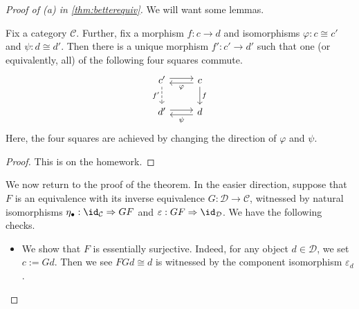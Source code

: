 \begin{proof}[Proof of (a) in \autoref{thm:betterequiv}]
	We will want some lemmas.
	\begin{lemma} \label{lem:optimize}
		Fix a category $\mathcal C$. Further, fix a morphism $f:c\to d$ and isomorphisms $\varphi:c\cong c'$ and $\psi:d\cong d'$. Then there is a unique morphism $f':c'\to d'$ such that one (or equivalently, all) of the following four squares commute.
		\[\begin{tikzcd}
			{c'} & c \\
			{d'} & d
			\arrow["{f'}"', dashed, from=1-1, to=2-1]
			\arrow[shift left=1, from=1-1, to=1-2]
			\arrow["\varphi", shift left=1, from=1-2, to=1-1]
			\arrow[shift left=1, from=2-1, to=2-2]
			\arrow["\psi", shift left=1, from=2-2, to=2-1]
			\arrow["f", from=1-2, to=2-2]
		\end{tikzcd}\]
		Here, the four squares are achieved by changing the direction of $\varphi$ and $\psi$.
	\end{lemma}
	\begin{proof}
		This is on the homework.
	\end{proof}
	We now return to the proof of the theorem. In the easier direction, suppose that $F$ is an equivalence with its inverse equivalence $G:\mathcal D\to\mathcal C$, witnessed by natural isomorphisms $\eta_\bullet:\id_\mathcal C\Rightarrow GF$ and $\varepsilon:GF\Rightarrow\id_\mathcal D$. We have the following checks.
	\begin{itemize}
		\item We show that $F$ is essentially surjective. Indeed, for any object $d\in\mathcal D$, we set $c:=Gd$. Then we see $FGd\cong d$ is witnessed by the component isomorphism $\varepsilon_d$.


\end{itemize}
\end{proof}
